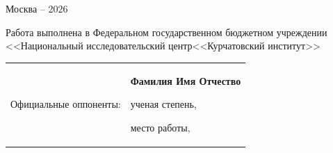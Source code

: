 \documentclass[a4paper,14pt]{extarticle}                     %
\theoremstyle{plain}                                         %
\begin{document}
\vspace{0pt plus4fill} %
{\centering Москва -- 2026\par}

\newpage
\thispagestyle{empty}
\noindent Работа выполнена в Федеральном государственном бюджетном учреждении <<Национальный исследовательский центр<<Курчатовский институт>>

\vspace{0.008\paperheight plus1fill}
\noindent%
\begin{tabularx}{\textwidth}{@{}lX@{}}
    Официальные оппоненты:  &
        \textbf{Фамилия Имя Отчество}\par
        ученая степень,\par
        место работы,\par

\end{tabularx}
\end{document}

